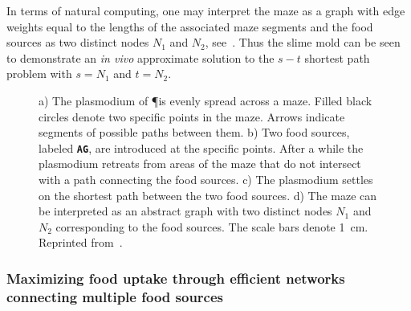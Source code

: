 			In terms of natural computing, one may interpret the maze as a graph with edge weights equal to the lengths of the associated maze segments and the food sources as two distinct nodes $N_1$ and $N_2$, see~. Thus the slime mold \Pp can be seen to demonstrate an \emph{in vivo} approximate solution to the $s-t$ shortest path problem with $s=N_1$ and $t=N_2$. 

			\begin{figure}
				\centering
				\newline
				
				\caption[Classic maze experiment with \P]{ a) The plasmodium of 
				\P is evenly spread across a maze. Filled black circles denote two specific points in the maze. Arrows indicate segments of possible paths between them. b) Two food sources, labeled \textbf{\texttt{AG}}, are introduced at the specific points. After a while the plasmodium retreats from areas of the maze that do not intersect with a path connecting the food sources. c) The plasmodium settles on the shortest path between the two food sources. d) The maze can be interpreted as an abstract graph with two distinct nodes $N_1$ and $N_2$ corresponding to the food sources. The scale bars denote \SI{1}{\centi\metre}. Reprinted from~\cite{Tero2007553}.}
				\label{fig:maze}
			\end{figure}

			\FloatBarrier

		\subsubsection{Maximizing food uptake through efficient networks connecting multiple food sources}

